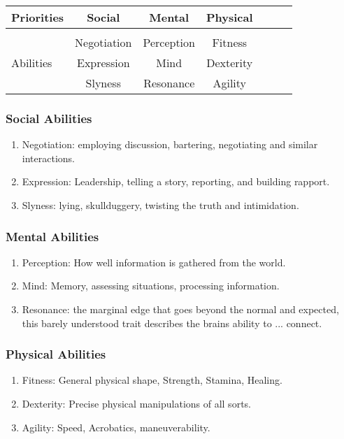 \documentclass{article}
\begin{document}
    \begin{tabular}{l||cccccc}
        Priorities       &Social       &Mental         &Physical      \\\hline\\
                        &Negotiation  &Perception     &Fitness        \\
        Abilities       &Expression   &Mind           &Dexterity      \\
                        &Slyness      &Resonance      &Agility        \\
    \end{tabular}\newline

    \subsubsection{Social Abilities} 
        \begin{enumerate}[label= -]
            \item {Negotiation}: employing discussion, bartering, negotiating and similar interactions.
            \item {Expression}: Leadership, telling a story, reporting, and building rapport.
            \item {Slyness}: lying, skullduggery, twisting the truth and intimidation.
        \end{enumerate}
    \subsubsection{Mental Abilities} 
        \begin{enumerate}[label=-]
            \item {Perception}: How well information is gathered from the world.
            \item {Mind}: Memory, assessing situations, processing information.
            \item {Resonance}: the marginal edge that goes beyond the normal and expected, this barely understood trait
            describes the brains ability to ... connect.
        \end{enumerate}
    \subsubsection{Physical Abilities} 
        \begin{enumerate}[label= -]
            \item {Fitness}: General physical shape, Strength, Stamina, Healing.
            \item {Dexterity}: Precise physical manipulations of all sorts.
            \item {Agility}: Speed, Acrobatics, maneuverability.
        \end{enumerate}
\end{document}

